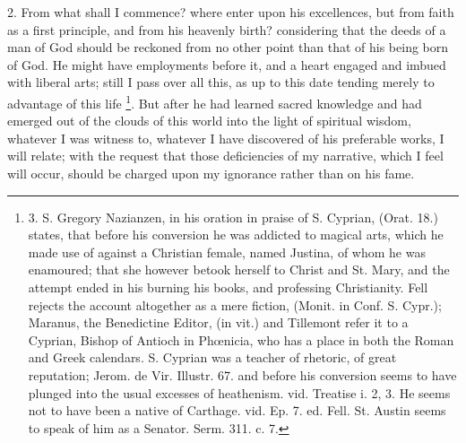2. From what shall I commence? where enter
upon his excellences, but from faith as a first principle, and from
his heavenly birth? considering that the deeds of a man of God should
be reckoned from no other point than that of his being born of God. He
might have employments before it, and a heart engaged and imbued with
liberal arts; still I pass over all this, as up to this date tending
merely to advantage of this life \footnote{3. S.
Gregory Nazianzen, in his oration in praise of S. Cyprian, (Orat. 18.)
states, that before his conversion he was addicted to magical arts,
which he made use of against a Christian female, named Justina, of
whom he was enamoured; that she however betook herself to Christ and
St. Mary, and the attempt ended in his burning his books, and
professing Christianity. Fell rejects the account altogether as a mere
fiction, (Monit. in Conf. S. Cypr.); Maranus, the Benedictine Editor,
(in vit.) and Tillemont refer it to a Cyprian, Bishop of Antioch in Phœnicia,
who has a place in both the Roman and Greek calendars. S. Cyprian was
a teacher of rhetoric, of great reputation; Jerom. de Vir. Illustr.
67. and before his conversion seems to have plunged into the usual
excesses of heathenism. vid. Treatise i. 2, 3. He seems not to have
been a native of Carthage. vid. Ep. 7. ed. Fell. St. Austin seems to
speak of him as a Senator. Serm. 311. c. 7.}. But after he had learned sacred knowledge and had emerged out
of the clouds of this world into the light of spiritual wisdom,
whatever I was witness to, whatever I have discovered of his
preferable works, I will relate; with the request that those
deficiencies of my narrative, which I feel will occur, should be
charged upon my ignorance rather than on his fame.

